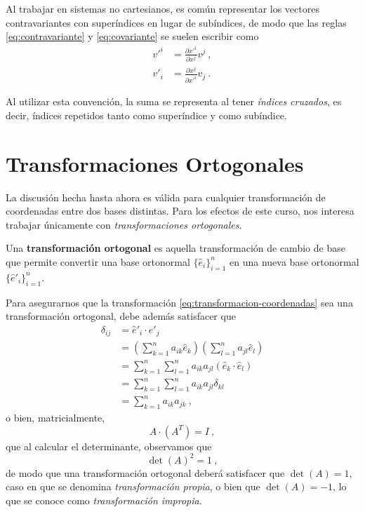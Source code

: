 Al trabajar en sistemas no cartesianos, es común representar los vectores contravariantes con superíndices en lugar de subíndices, de modo que las reglas \eqref{eq:contravariante} y \eqref{eq:covariante} se suelen escribir como
\begin{align*}
    v'^i & = \frac{\partial x'^{i}}{\partial x^j} v^j \ , \\
    v'_i & = \frac{\partial x^j}{\partial x'^{i}} v_j \ .
\end{align*}

Al utilizar esta convención, la suma se representa al tener \emph{índices cruzados}, es decir, índices repetidos tanto como superíndice y como subíndice.

\section{Transformaciones Ortogonales}

La discusión hecha hasta ahora es válida para cualquier transformación de coordenadas entre dos bases distintas. Para los efectos de este curso, nos interesa trabajar únicamente con \emph{transformaciones ortogonales}.

\begin{defi}
    Una \textbf{transformación ortogonal} es aquella transformación de cambio de base que permite convertir una base ortonormal $\{\hat{e}_i\}_{i=1}^n$ en una nueva base ortonormal $\{\hat{e}'_i\}_{i=1}^n$.
\end{defi}

Para asegurarnos que la transformación \eqref{eq:transformacion-coordenadas} sea una transformación ortogonal, debe además satisfacer que
\begin{align}
    \delta_{ij} & = \hat{e}'_i \cdot \hat{e}'_j \\
    & = \left( \sum_{k=1}^n a_{ik} \hat{e}_k \right) \left( \sum_{l=1}^n a_{jl} \hat{e}_l \right) \\
    & = \sum_{k=1}^n \sum_{l=1}^n a_{ik} a_{jl} (\hat{e}_k \cdot \hat{e}_l) \\
    & = \sum_{k=1}^n \sum_{l=1}^n a_{ik} a_{jl} \delta_{kl} \\
    & = \sum_{k=1}^n a_{ik} a_{jk} \ , \label{eq:delta-transformacion-ortogonal}
\end{align}
o bien, matricialmente,
\begin{equation}\label{eq:condicion-matricial}
    A \cdot (A^T) = I \ ,
\end{equation}
que al calcular el determinante, observamos que
\begin{equation}
    \det(A)^2 = 1 \ , 
\end{equation}
de modo que una transformación ortogonal deberá satisfacer que $\det(A) = 1$, caso en que se denomina \emph{transformación propia}, o bien que $\det(A) = -1$, lo que se conoce como \emph{transformación impropia}.

